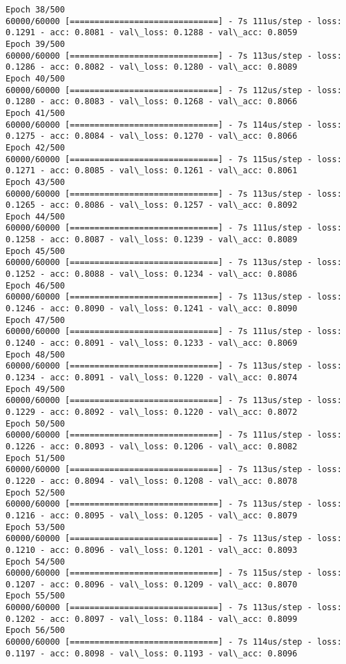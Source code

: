\documentclass[11pt]{article}
\begin{document}
\begin{Verbatim}[commandchars=\\\{\}]
Epoch 38/500
60000/60000 [==============================] - 7s 111us/step - loss: 0.1291 - acc: 0.8081 - val\_loss: 0.1288 - val\_acc: 0.8059
Epoch 39/500
60000/60000 [==============================] - 7s 113us/step - loss: 0.1286 - acc: 0.8082 - val\_loss: 0.1280 - val\_acc: 0.8089
Epoch 40/500
60000/60000 [==============================] - 7s 112us/step - loss: 0.1280 - acc: 0.8083 - val\_loss: 0.1268 - val\_acc: 0.8066
Epoch 41/500
60000/60000 [==============================] - 7s 114us/step - loss: 0.1275 - acc: 0.8084 - val\_loss: 0.1270 - val\_acc: 0.8066
Epoch 42/500
60000/60000 [==============================] - 7s 115us/step - loss: 0.1271 - acc: 0.8085 - val\_loss: 0.1261 - val\_acc: 0.8061
Epoch 43/500
60000/60000 [==============================] - 7s 113us/step - loss: 0.1265 - acc: 0.8086 - val\_loss: 0.1257 - val\_acc: 0.8092
Epoch 44/500
60000/60000 [==============================] - 7s 111us/step - loss: 0.1258 - acc: 0.8087 - val\_loss: 0.1239 - val\_acc: 0.8089
Epoch 45/500
60000/60000 [==============================] - 7s 113us/step - loss: 0.1252 - acc: 0.8088 - val\_loss: 0.1234 - val\_acc: 0.8086
Epoch 46/500
60000/60000 [==============================] - 7s 113us/step - loss: 0.1246 - acc: 0.8090 - val\_loss: 0.1241 - val\_acc: 0.8090
Epoch 47/500
60000/60000 [==============================] - 7s 111us/step - loss: 0.1240 - acc: 0.8091 - val\_loss: 0.1233 - val\_acc: 0.8069
Epoch 48/500
60000/60000 [==============================] - 7s 113us/step - loss: 0.1234 - acc: 0.8091 - val\_loss: 0.1220 - val\_acc: 0.8074
Epoch 49/500
60000/60000 [==============================] - 7s 113us/step - loss: 0.1229 - acc: 0.8092 - val\_loss: 0.1220 - val\_acc: 0.8072
Epoch 50/500
60000/60000 [==============================] - 7s 111us/step - loss: 0.1226 - acc: 0.8093 - val\_loss: 0.1206 - val\_acc: 0.8082
Epoch 51/500
60000/60000 [==============================] - 7s 113us/step - loss: 0.1220 - acc: 0.8094 - val\_loss: 0.1208 - val\_acc: 0.8078
Epoch 52/500
60000/60000 [==============================] - 7s 113us/step - loss: 0.1216 - acc: 0.8095 - val\_loss: 0.1205 - val\_acc: 0.8079
Epoch 53/500
60000/60000 [==============================] - 7s 113us/step - loss: 0.1210 - acc: 0.8096 - val\_loss: 0.1201 - val\_acc: 0.8093
Epoch 54/500
60000/60000 [==============================] - 7s 115us/step - loss: 0.1207 - acc: 0.8096 - val\_loss: 0.1209 - val\_acc: 0.8070
Epoch 55/500
60000/60000 [==============================] - 7s 113us/step - loss: 0.1202 - acc: 0.8097 - val\_loss: 0.1184 - val\_acc: 0.8099
Epoch 56/500
60000/60000 [==============================] - 7s 114us/step - loss: 0.1197 - acc: 0.8098 - val\_loss: 0.1193 - val\_acc: 0.8096

\end{Verbatim}
\end{document}
